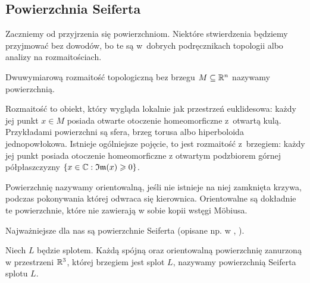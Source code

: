 %

\subsection{Powierzchnia Seiferta}
Zaczniemy od przyjrzenia się powierzchniom.
Niektóre stwierdzenia będziemy przyjmować bez dowodów, bo te są w~dobrych podręcznikach topologii albo analizy na rozmaitościach.

\begin{definition}
%
    Dwuwymiarową rozmaitość topologiczną bez brzegu $M \subseteq \mathbb R^n$ nazywamy powierzchnią.
\end{definition}

Rozmaitość to obiekt, który wygląda lokalnie jak przestrzeń euklidesowa: każdy jej punkt $x \in M$ posiada otwarte otoczenie homeomorficzne z~otwartą kulą.
Przykładami powierzchni są sfera, brzeg torusa albo hiperboloida jednopowłokowa.
Istnieje ogólniejsze pojęcie, to jest rozmaitość z~brzegiem: każdy jej punkt posiada otoczenie homeomorficzne z otwartym podzbiorem górnej półpłaszczyzny $\{x \in \mathbb C: \mathfrak{Im}(x) \geqslant 0\}$.


Powierzchnię nazywamy orientowalną, jeśli nie istnieje na niej zamknięta krzywa, podczas pokonywania której odwraca się kierownica.
%
Orientowalne są dokładnie te powierzchnie, które nie zawierają w sobie kopii wstęgi Möbiusa.

%
Najważniejsze dla nas są powierzchnie Seiferta (opisane np. w \cite[s. 46-72]{kawauchi1996}, \cite[s. 19-21]{burde2014}).

\begin{definition}
    Niech $L$ będzie splotem.
    Każdą spójną oraz orientowalną powierzchnię zanurzoną w przestrzeni $\mathbb R^3$, której brzegiem jest splot $L$, nazywamy powierzchnią Seiferta splotu $L$.
\end{definition}


